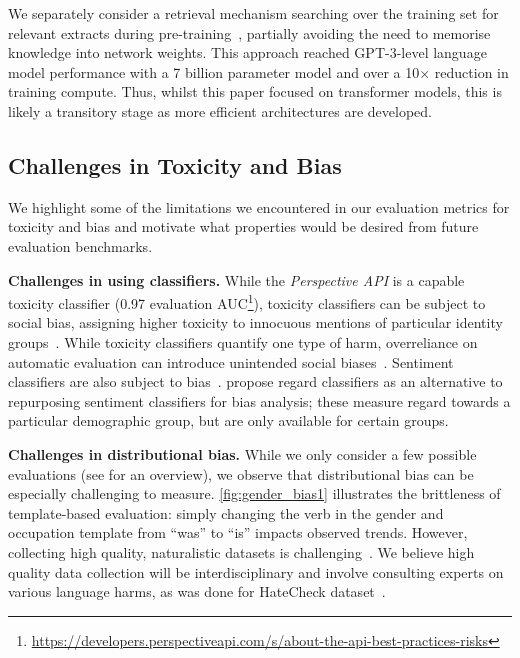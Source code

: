 We separately consider a retrieval mechanism searching over the training set for relevant extracts during pre-training~\citep{borgeaud2021retrieval}, partially avoiding the need to memorise knowledge into network weights. This approach reached GPT-3-level language model performance with a 7 billion parameter model and over a 10$\times$ reduction in training compute. Thus, whilst this paper focused on transformer models, this is likely a transitory stage as more efficient architectures are developed.

\subsection{Challenges in Toxicity and Bias}
\label{tox-bias-limitations}

We highlight some of the limitations we encountered in our evaluation metrics for toxicity and bias and motivate what properties would be desired from future evaluation benchmarks.

\textbf{Challenges in using classifiers.} While the \textit{Perspective API} is a capable toxicity classifier (0.97 evaluation AUC\footnote{\url{https://developers.perspectiveapi.com/s/about-the-api-best-practices-risks}}), toxicity classifiers can be subject to social bias, assigning higher toxicity to innocuous mentions of particular identity groups~\citep{Dixon2018Measuring,rottgerhatecheck}. While toxicity classifiers quantify one type of harm, overreliance on automatic evaluation can introduce unintended social biases~\citep{xu2021detoxifying,welbl2021challenges}. Sentiment classifiers are also subject to bias~\citep{kiritchenko2018sentiment}.  
\citet{sheng2019woman} propose regard classifiers as an alternative to repurposing sentiment classifiers for bias analysis; these measure regard towards a particular demographic group, but are only available for certain groups.

\textbf{Challenges in distributional bias.} While we only consider a few possible evaluations (see \cite{sheng2021societal} for an overview), we observe that distributional bias can be especially challenging to measure.
\autoref{fig:gender_bias1} illustrates the brittleness of template-based evaluation: simply changing the verb in the gender and occupation template from ``was'' to ``is'' impacts observed trends. However, collecting high quality, naturalistic datasets is challenging~\citep{blodgett2021stereotyping}. We believe high quality data collection will be interdisciplinary and involve consulting experts on various language harms, as was done for HateCheck dataset~\citep{rottgerhatecheck}.

